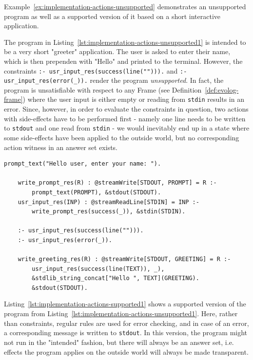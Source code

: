 Example~\ref{ex:implementation-actions-unsupported} demonstrates an unsupported program as well as a supported version of it based on a short interactive application.

\begin{example}
\label{ex:implementation-actions-unsupported}    
The program in Listing~\ref{lst:implementation-actions-unsupported1} is intended to be a very short "greeter" application. The user is asked to enter their name, which is then prependen with "Hello" and printed to the terminal. However, the constraints \texttt{:- usr\_input\_res(success(line(""))).} and \texttt{:- usr\_input\_res(error(\_)).} render the program \emph{unsupported}. In fact, the program is unsatisfiable with respect to any Frame (see Definition~\ref{def:evolog-frame}) where the user input is either empty or reading from \texttt{stdin} results in an error. Since, however, in order to evaluate the constraints in question, two actions with side-effects have to be performed first - namely one line needs to be written to \texttt{stdout} and one read from \texttt{stdin} - we would inevitably end up in a state where some side-effects have been applied to the outside world, but no corresponding action witness in an answer set exists.

\begin{lstlisting}[style=asp-code, label={lst:implementation-actions-unsupported1}, caption={An unsupported "greeter" application.}]
    prompt_text("Hello user, enter your name: ").
        
    write_prompt_res(R) : @streamWrite[STDOUT, PROMPT] = R :- 
        prompt_text(PROMPT), &stdout(STDOUT).
    usr_input_res(INP) : @streamReadLine[STDIN] = INP :- 
        write_prompt_res(success(_)), &stdin(STDIN).

    :- usr_input_res(success(line(""))).
    :- usr_input_res(error(_)).  

    write_greeting_res(R) : @streamWrite[STDOUT, GREETING] = R :- 
        usr_input_res(success(line(TEXT)), _),
        &stdlib_string_concat["Hello ", TEXT](GREETING).
        &stdout(STDOUT).   
\end{lstlisting}       

Listing~\ref{lst:implementation-actions-supported1} shows a supported version of the program from Listing~\ref{lst:implementation-actions-unsupported1}. Here, rather than constraints, regular rules are used for error checking, and in case of an error, a corresponding message is written to \texttt{stdout}. In this version, the program might not run in the "intended" fashion, but there will always be an answer set, i.e. effects the program applies on the outside world will always be made transparent.


\end{example}
